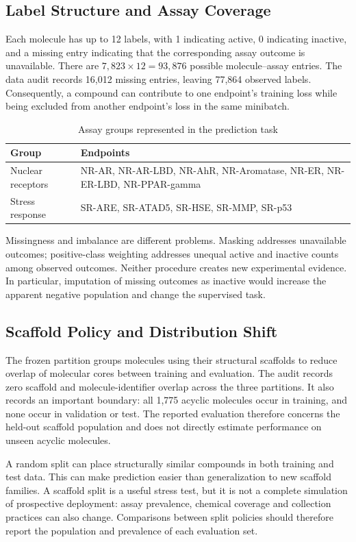 \documentclass[conference]{IEEEtran}
\begin{document}
\subsection{Label Structure and Assay Coverage}
Each molecule has up to 12 labels, with 1 indicating active, 0 indicating inactive, and a missing entry indicating that the corresponding assay outcome is unavailable. There are $7,823\times12=93,876$ possible molecule--assay entries. The data audit records 16,012 missing entries, leaving 77,864 observed labels. Consequently, a compound can contribute to one endpoint's training loss while being excluded from another endpoint's loss in the same minibatch.

\begin{table}[htbp]
\centering\caption{Assay groups represented in the prediction task}
\begin{tabular}{p{}p{}}\toprule
Group & Endpoints\\\midrule
Nuclear receptors & NR-AR, NR-AR-LBD, NR-AhR, NR-Aromatase, NR-ER, NR-ER-LBD, NR-PPAR-gamma\\
Stress response & SR-ARE, SR-ATAD5, SR-HSE, SR-MMP, SR-p53\\\bottomrule
\end{tabular}
\end{table}

Missingness and imbalance are different problems. Masking addresses unavailable outcomes; positive-class weighting addresses unequal active and inactive counts among observed outcomes. Neither procedure creates new experimental evidence. In particular, imputation of missing outcomes as inactive would increase the apparent negative population and change the supervised task.

\subsection{Scaffold Policy and Distribution Shift}
The frozen partition groups molecules using their structural scaffolds to reduce overlap of molecular cores between training and evaluation. The audit records zero scaffold and molecule-identifier overlap across the three partitions. It also records an important boundary: all 1,775 acyclic molecules occur in training, and none occur in validation or test. The reported evaluation therefore concerns the held-out scaffold population and does not directly estimate performance on unseen acyclic molecules.

A random split can place structurally similar compounds in both training and test data. This can make prediction easier than generalization to new scaffold families. A scaffold split is a useful stress test, but it is not a complete simulation of prospective deployment: assay prevalence, chemical coverage and collection practices can also change. Comparisons between split policies should therefore report the population and prevalence of each evaluation set.
\end{document}
